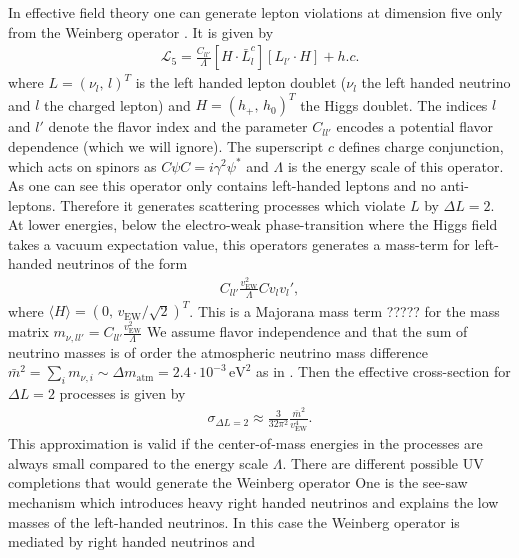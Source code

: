 \documentclass[13pt,a4paper,titlepage]{article}
\begin{document}
In effective field theory one can generate lepton violations at dimension five only from the
Weinberg operator \cite{Weinberg_operator_original_PhysRevLett.43.1566}. It is given by \cite[eq. 2]{Weinberg_at_colliders_Fuks_2021}
\begin{align}
\mathcal{L}_5 = \frac{C_{l l'}}{\Lambda} [H \cdot \bar{L}^c_l] [L_{l'} \cdot H] + h.c.
\end{align}
where $L = (\nu_l,\, l)^T$ is the left handed lepton doublet ($\nu_l$ the left handed neutrino and $l$ the charged lepton) and $H = (h_+,\, h_0)^T$ the Higgs doublet. The indices $l$ and $l'$ denote the flavor index and the parameter $C_{l l'}$ encodes a potential flavor dependence (which we will ignore).
The superscript $c$ defines charge conjunction, which acts on spinors as $C \psi C = i \gamma^2 \psi^*$
and $\Lambda$ is the energy scale of this operator.
As one can see this operator only contains left-handed leptons and no anti-leptons. Therefore
it generates scattering processes which violate $L$ by $\Delta L = 2$.
At lower energies, below the electro-weak phase-transition where the Higgs field takes a vacuum expectation value, this operators generates a mass-term for left-handed neutrinos of the form
\begin{align}
C_{ll'} \frac{v_{\mathrm{EW}}^2}{\Lambda} C v_l v_l',
\end{align}
where $\langle H \rangle = (0,\, v_{\mathrm{EW}} / \sqrt{2})^T$.
This is a Majorana mass term ????? for the mass matrix $m_{\nu, ll'} = C_{ll'} \frac{v_{\mathrm{EW}}^2}{\Lambda}$
We assume flavor independence and that the sum of neutrino masses
is of order the atmospheric neutrino mass difference $\bar{m}^2 = \sum_i m_{\nu, i} \sim \Delta m_{\mathrm{atm}} = 2.4 \cdot 10^{-3} \, \mathrm{eV}^2$ as in \cite{Kusenko_2015_Axion_Leptogenesis}.
Then the effective cross-section for $\Delta L = 2$ processes
is given by \cite[eq. 9]{Kusenko_2015_Axion_Leptogenesis}
\begin{align}
\label{eq:weinberg_rate}
\sigma_{\Delta L = 2} \approx \frac{3}{32 \pi^2} \frac{\bar{m}^2}{v_{\mathrm{EW}}^4}.
\end{align}
This approximation is valid if the center-of-mass energies in the processes are always small compared to the energy scale $\Lambda$.
There are different possible UV completions that would generate the Weinberg operator
One is the see-saw mechanism which introduces heavy right handed neutrinos and explains the low masses of the left-handed neutrinos.
In this case the Weinberg operator is mediated by right handed neutrinos and
\end{document}
